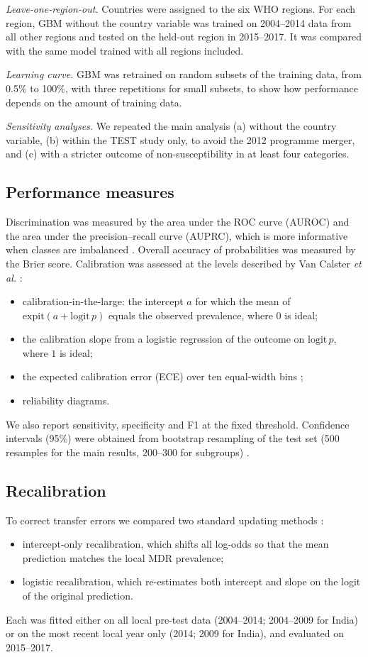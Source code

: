\documentclass[11pt,a4paper]{article}
\begin{document}
\textit{Leave-one-region-out.} Countries were assigned to the six WHO regions. For each region, GBM without the country variable was trained on 2004--2014 data from all other regions and tested on the held-out region in 2015--2017. It was compared with the same model trained with all regions included.

\textit{Learning curve.} GBM was retrained on random subsets of the training data, from 0.5\% to 100\%, with three repetitions for small subsets, to show how performance depends on the amount of training data.

\textit{Sensitivity analyses.} We repeated the main analysis (a) without the country variable, (b) within the TEST study only, to avoid the 2012 programme merger, and (c) with a stricter outcome of non-susceptibility in at least four categories.

\subsection{Performance measures}
Discrimination was measured by the area under the ROC curve (AUROC) and the area under the precision--recall curve (AUPRC), which is more informative when classes are imbalanced \cite{saito2015}. Overall accuracy of probabilities was measured by the Brier score. Calibration was assessed at the levels described by Van Calster \textit{et al.} \cite{vancalster2016}:
\begin{itemize}
\item calibration-in-the-large: the intercept $a$ for which the mean of $\mathrm{expit}(a+\mathrm{logit}\,p)$ equals the observed prevalence, where $0$ is ideal;
\item the calibration slope from a logistic regression of the outcome on $\mathrm{logit}\,p$, where $1$ is ideal;
\item the expected calibration error (ECE) over ten equal-width bins \cite{guo2017};
\item reliability diagrams.
\end{itemize}
We also report sensitivity, specificity and F1 at the fixed threshold. Confidence intervals (95\%) were obtained from bootstrap resampling of the test set (500 resamples for the main results, 200--300 for subgroups) \cite{efron1993}.

\subsection{Recalibration}
To correct transfer errors we compared two standard updating methods \cite{janssen2008,steyerberg2019}:
\begin{itemize}
\item intercept-only recalibration, which shifts all log-odds so that the mean prediction matches the local MDR prevalence;
\item logistic recalibration, which re-estimates both intercept and slope on the logit of the original prediction.
\end{itemize}
Each was fitted either on all local pre-test data (2004--2014; 2004--2009 for India) or on the most recent local year only (2014; 2009 for India), and evaluated on 2015--2017.
\end{document}
